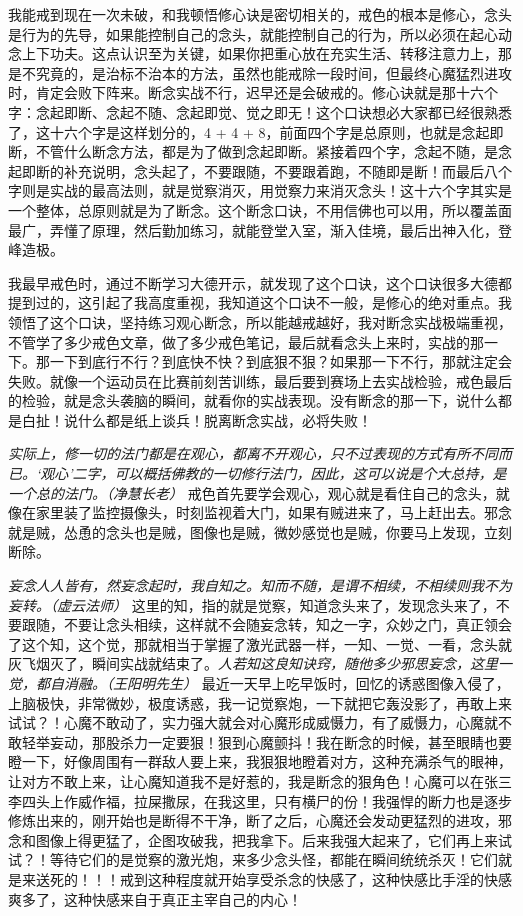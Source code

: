 我能戒到现在一次未破，和我顿悟修心诀是密切相关的，戒色的根本是修心，念头是行为的先导，如果能控制自己的念头，就能控制自己的行为，所以必须在起心动念上下功夫。这点认识至为关键，如果你把重心放在充实生活、转移注意力上，那是不究竟的，是治标不治本的方法，虽然也能戒除一段时间，但最终心魔猛烈进攻时，肯定会败下阵来。断念实战不行，迟早还是会破戒的。修心诀就是那十六个字：念起即断、念起不随、念起即觉、觉之即无！这个口诀想必大家都已经很熟悉了，这十六个字是这样划分的，4 + 4 + 8，前面四个字是总原则，也就是念起即断，不管什么断念方法，都是为了做到念起即断。紧接着四个字，念起不随，是念起即断的补充说明，念头起了，不要跟随，不要跟着跑，不随即是断！而最后八个字则是实战的最高法则，就是觉察消灭，用觉察力来消灭念头！这十六个字其实是一个整体，总原则就是为了断念。这个断念口诀，不用信佛也可以用，所以覆盖面最广，弄懂了原理，然后勤加练习，就能登堂入室，渐入佳境，最后出神入化，登峰造极。

我最早戒色时，通过不断学习大德开示，就发现了这个口诀，这个口诀很多大德都提到过的，这引起了我高度重视，我知道这个口诀不一般，是修心的绝对重点。我领悟了这个口诀，坚持练习观心断念，所以能越戒越好，我对断念实战极端重视，不管学了多少戒色文章，做了多少戒色笔记，最后就看念头上来时，实战的那一下。那一下到底行不行？到底快不快？到底狠不狠？如果那一下不行，那就注定会失败。就像一个运动员在比赛前刻苦训练，最后要到赛场上去实战检验，戒色最后的检验，就是念头袭脑的瞬间，就看你的实战表现。没有断念的那一下，说什么都是白扯！说什么都是纸上谈兵！脱离断念实战，必将失败！

\textit{实际上，修一切的法门都是在观心，都离不开观心，只不过表现的方式有所不同而已。‘观心’二字，可以概括佛教的一切修行法门，因此，这可以说是个大总持，是一个总的法门。（净慧长老）} 戒色首先要学会观心，观心就是看住自己的念头，就像在家里装了监控摄像头，时刻监视着大门，如果有贼进来了，马上赶出去。邪念就是贼，怂恿的念头也是贼，图像也是贼，微妙感觉也是贼，你要马上发现，立刻断除。

\textit{妄念人人皆有，然妄念起时，我自知之。知而不随，是谓不相续，不相续则我不为妄转。（虚云法师）} 这里的知，指的就是觉察，知道念头来了，发现念头来了，不要跟随，不要让念头相续，这样就不会随妄念转，知之一字，众妙之门，真正领会了这个知，这个觉，那就相当于掌握了激光武器一样，一知、一觉、一看，念头就灰飞烟灭了，瞬间实战就结束了。\textit{人若知这良知诀窍，随他多少邪思妄念，这里一觉，都自消融。（王阳明先生）} 最近一天早上吃早饭时，回忆的诱惑图像入侵了，上脑极快，非常微妙，极度诱惑，我一记觉察炮，一下就把它轰没影了，再敢上来试试？！心魔不敢动了，实力强大就会对心魔形成威慑力，有了威慑力，心魔就不敢轻举妄动，那股杀力一定要狠！狠到心魔颤抖！我在断念的时候，甚至眼睛也要瞪一下，好像周围有一群敌人要上来，我狠狠地瞪着对方，这种充满杀气的眼神，让对方不敢上来，让心魔知道我不是好惹的，我是断念的狠角色！心魔可以在张三李四头上作威作福，拉屎撒尿，在我这里，只有横尸的份！我强悍的断力也是逐步修炼出来的，刚开始也是断得不干净，断了之后，心魔还会发动更猛烈的进攻，邪念和图像上得更猛了，企图攻破我，把我拿下。后来我强大起来了，它们再上来试试？！等待它们的是觉察的激光炮，来多少念头怪，都能在瞬间统统杀灭！它们就是来送死的！！！戒到这种程度就开始享受杀念的快感了，这种快感比手淫的快感爽多了，这种快感来自于真正主宰自己的内心！

